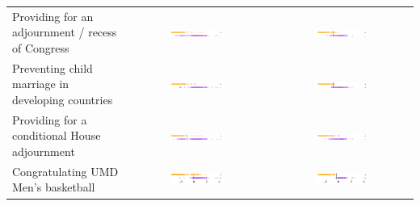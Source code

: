 \begin{table}
\begin{tabular}{|p{4.3cm}|c|c|}
Providing for an adjournment / recess of Congress
& \includegraphics[width=0.4\textwidth]{chapter_spatial_voting_with_text/figures/3397_ideal_point_4.pdf}
& \includegraphics[width=0.4\textwidth]{chapter_spatial_voting_with_text/figures/3397_adjusted_ideal_point_4.pdf} \\

Preventing child marriage in developing countries
& \includegraphics[width=0.4\textwidth]{chapter_spatial_voting_with_text/figures/3397_ideal_point_3.pdf}
& \includegraphics[width=0.4\textwidth]{chapter_spatial_voting_with_text/figures/3397_adjusted_ideal_point_3.pdf} \\

Providing for a conditional House adjournment
& \includegraphics[width=0.4\textwidth]{chapter_spatial_voting_with_text/figures/3397_ideal_point_2.pdf}
& \includegraphics[width=0.4\textwidth]{chapter_spatial_voting_with_text/figures/3397_adjusted_ideal_point_2.pdf} \\

Congratulating UMD Men's basketball
& \includegraphics[width=0.4\textwidth]{chapter_spatial_voting_with_text/figures/3397_ideal_point_1.pdf}
& \includegraphics[width=0.4\textwidth]{chapter_spatial_voting_with_text/figures/3397_adjusted_ideal_point_1.pdf} \\
\hline
  \end{tabular}
\end{table}

